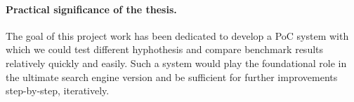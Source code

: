 \paragraph{Practical significance of the thesis.}
The goal of this project work has been dedicated to develop a PoC system with which we could test 
different hyphothesis and compare benchmark results relatively quickly and easily. Such a system would 
play the foundational role in the ultimate search engine version and be sufficient for further 
improvements step-by-step, iteratively.
